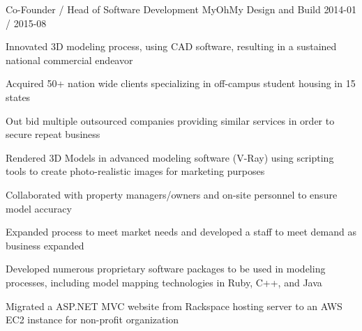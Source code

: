 \documentclass[11pt, a4paper]{awesomecv}
\begin{document}
\begin{cventries}
  \cventry
    {Co-Founder / Head of Software Development}
    {MyOhMy Design and Build}
    {}
    {2014-01 / 2015-08}
    {
          \begin{cvitems}
                    \item{Innovated 3D modeling process, using CAD software, resulting in a sustained national commercial endeavor}
                    \item{Acquired 50+ nation wide clients specializing in off-campus student housing in 15 states}
                    \item{Out bid multiple outsourced companies providing similar services in order to secure repeat business}
                    \item{Rendered 3D Models in advanced modeling software (V-Ray) using scripting tools to create photo-realistic images for marketing purposes}
                    \item{Collaborated with property managers/owners and on-site personnel to ensure model accuracy}
                    \item{Expanded process to meet market needs and developed a staff to meet demand as business expanded}
                    \item{Developed numerous proprietary software packages to be used in modeling processes, including model mapping technologies in Ruby, C++, and Java}
                    \item{Migrated a ASP.NET MVC website from Rackspace hosting server to an AWS EC2 instance for non-profit organization}
          \end{cvitems}
    }
 
\end{cventries}
\end{document}
